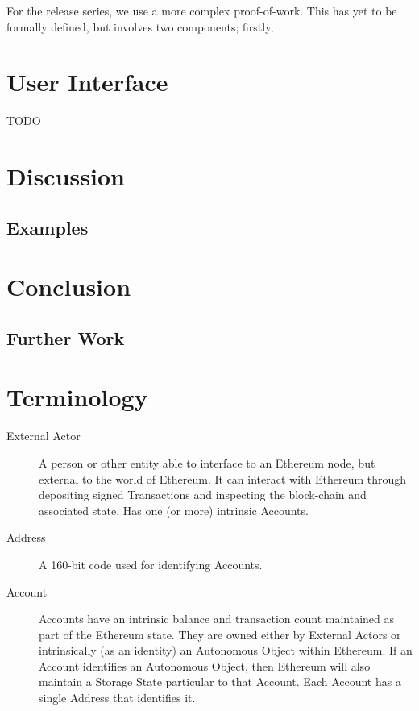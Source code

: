 \documentclass[9pt,oneside]{amsart}
\begin{document}
\begin{multicols}{2}
For the release series, we use a more complex proof-of-work. This has yet to be formally defined, but involves two components; firstly, 

\section{User Interface}

TODO 

\section{Discussion} \label{ch:discussion}

\subsection{Examples} \label{ch:examples}

\section{Conclusion} \label{ch:conclusion}

\subsection{Further Work} \label{ch:further}




\appendix

\section{Terminology}

\begin{description}
\item[External Actor] A person or other entity able to interface to an Ethereum node, but external to the world of Ethereum. It can interact with Ethereum through depositing signed Transactions and inspecting the block-chain and associated state. Has one (or more) intrinsic Accounts.

\item[Address] A 160-bit code used for identifying Accounts.

\item[Account] Accounts have an intrinsic balance and transaction count maintained as part of the Ethereum state. They are owned either by External Actors or intrinsically (as an identity) an Autonomous Object within Ethereum. If an Account identifies an Autonomous Object, then Ethereum will also maintain a Storage State particular to that Account. Each Account has a single Address that identifies it.


\end{description}
\end{multicols}
\end{document}
